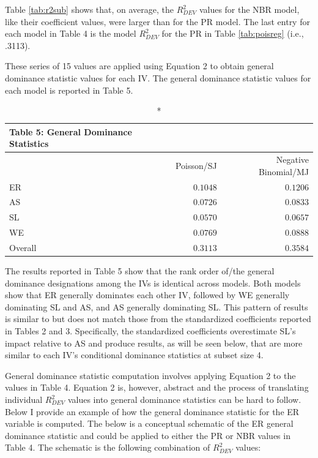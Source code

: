 \documentclass[ShortAfour,times,sageapa]{sagej}
\begin{document}
	Table \ref{tab:r2sub} shows that, on average, the $R^2_{DEV}$ values for the NBR model, like their coefficient values, were larger than for the PR model.
	The last entry for each model in Table 4 is the model $R^2_{DEV}$ for the PR in Table \ref{tab:poisreg} (i.e., .3113).
	
	

	These series of 15 values are applied using Equation 2 to obtain general dominance statistic values for each IV.
	The general dominance statistic values for each model is reported in Table 5.
	
	\begin{longtable}{l|rr}
		\caption*{
			{\large Table 5: General Dominance Statistics}
		} \\ 
		\toprule
		\multicolumn{1}{l}{} & Poisson/SJ & Negative Binomial/MJ \\ 
		\midrule
		ER & $0.1048$ & $0.1206$ \\ 
		AS & $0.0726$ & $0.0833$ \\ 
		SL & $0.0570$ & $0.0657$ \\ 
		WE & $0.0769$ & $0.0888$ \\ 
		\midrule
		Overall & $0.3113$ & $0.3584$ \\ 
		\bottomrule
	\end{longtable}

	The results reported in Table 5 show that the rank order of/the general dominance designations among the IVs is identical across models.
	Both models show that ER generally dominates each other IV, followed by WE generally dominating SL and AS, and AS generally dominating SL.
	This pattern of results is similar to but does not match those from the standardized coefficients reported in Tables 2 and 3.
	Specifically, the standardized coefficients overestimate SL's impact relative to AS and produce results, as will be seen below, that are more similar to each IV's conditional dominance statistics at subset size 4.
	
	General dominance statistic computation involves applying Equation 2 to the values in Table 4. 
	Equation 2 is, however, abstract and the process of translating individual $R^2_{DEV}$ values into general dominance statistics can be hard to follow.
	Below I provide an example of how the general dominance statistic for the ER variable is computed.
	The below is a conceptual schematic of the ER general dominance statistic and could be applied to either the PR or NBR values in Table 4.
	The schematic is the following combination of $R^2_{DEV}$ values:
	
\end{document}
